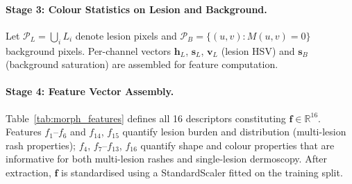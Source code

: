 \documentclass[preprint,12pt]{elsarticle}
\begin{document}
\paragraph{Stage 3: Colour Statistics on Lesion and Background.}
Let $\mathcal{P}_L = \bigcup_i L_i$ denote lesion pixels and
$\mathcal{P}_B = \{(u,v):M(u,v)=0\}$ background pixels.  Per-channel
vectors $\mathbf{h}_L$, $\mathbf{s}_L$, $\mathbf{v}_L$ (lesion HSV) and
$\mathbf{s}_B$ (background saturation) are assembled for feature
computation.

\paragraph{Stage 4: Feature Vector Assembly.}
Table~\ref{tab:morph_features} defines all 16 descriptors constituting
$\mathbf{f} \in \mathbb{R}^{16}$.  Features $f_1$--$f_6$ and $f_{14}$,
$f_{15}$ quantify lesion burden and distribution (multi-lesion rash
properties); $f_4$, $f_7$--$f_{13}$, $f_{16}$ quantify shape and colour
properties that are informative for both multi-lesion rashes and
single-lesion dermoscopy.  After extraction, $\mathbf{f}$ is standardised
using a StandardScaler fitted on the training split.
\end{document}
